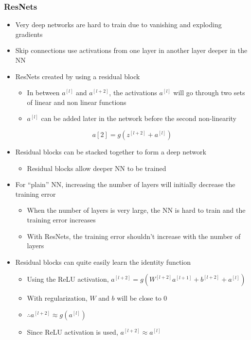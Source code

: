 \documentclass[12pt, letterpaper]{article}
\begin{document}
    \subsubsection{ResNets}
    \begin{itemize}
        \item Very deep networks are hard to train due to vanishing and exploding gradients
        \item Skip connections use activations from one layer in another layer deeper in the NN
        \item ResNets created by using a residual block
        \begin{itemize}
            \item In between $a^{[l]}$ and $a^{[l+2]}$, the activations $a^{[l]}$ will go through two sets of linear and non linear functions
            \item $a^{[l]}$ can be added later in the network before the second non-linearity
        \end{itemize}
        $$a{[2]}=g(z^{[l+2]}+a^{[l]})$$
        \item  Residual blocks can be stacked together to form a deep network
        \begin{itemize}
            \item Residual blocks allow deeper NN to be trained
        \end{itemize}
        \item For ``plain'' NN, increasing the number of layers will initially decrease the training error
        \begin{itemize}
            \item When the number of layers is very large, the NN is hard to train and the training error increases
            \item With ResNets, the training error shouldn't increase with the number of layers
        \end{itemize}
        \item Residual blocks can quite easily learn the identity function
        \begin{itemize}
            \item Using the ReLU activation, $a^{[l+2]}=g(W^{[l+2]}a^{[l+1]}+b^{[l+2]}+a^{[l]})$
            \item With regularization, $W$ and $b$ will be close to 0
            \item $\therefore a^{[l+2]}\approx g(a^{[l]})$
            \item Since ReLU activation is used, $a^{[l+2]}\approx a^{[l]}$

\end{itemize}
\end{itemize}
\end{document}
